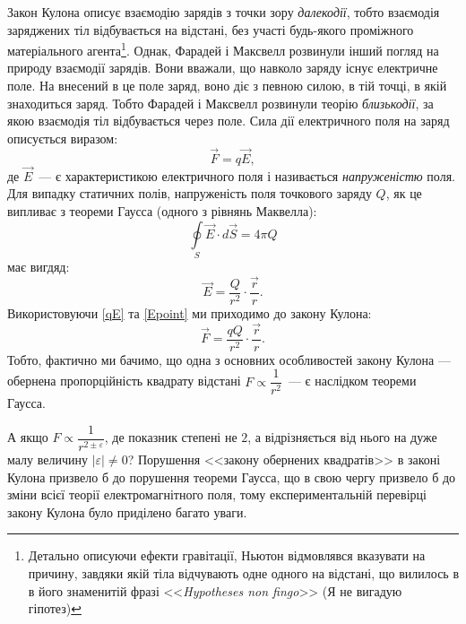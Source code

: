 \documentclass{LabWork}
\begin{document}
Закон Кулона описує взаємодію зарядів з точки зору \emph{далекодії}, тобто взаємодія заряджених тіл відбувається на відстані, без участі будь-якого проміжного матеріального агента\footnote{Детально описуючи ефекти гравітації, Ньютон відмовлявся вказувати на причину, завдяки якій тіла відчувають одне одного на відстані, що вилилось в в його знаменитій фразі <<\emph{Hypotheses non fingo}>> (Я не вигадую гіпотез)}. Однак, Фарадей і Максвелл розвинули інший погляд на природу взаємодії зарядів. Вони вважали, що навколо заряду існує електричне поле. На внесений в це поле заряд, воно діє з певною силою, в  тій точці, в якій знаходиться заряд. Тобто Фарадей і Максвелл розвинули теорію \emph{близькодії}, за якою взаємодія тіл відбувається через поле.  Сила дії електричного поля на заряд описується виразом:
\begin{equation}\label{qE}
    \vec{F} = q\vec{E},
\end{equation}
де $\vec{E}$~--- є характеристикою електричного поля і називається \emph{напруженістю} поля. Для випадку статичних полів, напруженість поля точкового заряду $Q$, як це випливає з теореми Гаусса (одного з рівнянь Маквелла):
\begin{equation}\label{Gauss}
    \oint\limits_S \vec{E}\cdot d\vec{S} = 4\pi Q
\end{equation}
 має вигдяд:
\begin{equation}\label{Epoint}
    \vec{E} = \frac{Q}{r^2}\cdot\frac{\vec{r}}{r}.
\end{equation}
Використовуючи \eqref{qE} та \eqref{Epoint} ми приходимо до закону Кулона:
\begin{equation*}\label{}
    \vec{F} = \frac{qQ}{r^2}\cdot\frac{\vec{r}}{r}.
\end{equation*}
Тобто, фактично ми бачимо, що одна з основних особливостей закону Кулона --- обернена пропорційність квадрату відстані $F \propto \dfrac1{r^2}$~--- є наслідком теореми Гаусса. 

А якщо $F \propto \dfrac1{r^{2 \pm \varepsilon}}$, де  показник степені не $2$, а відрізняється від нього на дуже малу величину $|\varepsilon| \neq 0$? Порушення <<закону обернених квадратів>> в законі Кулона призвело б до порушення теореми Гаусса, що в свою чергу призвело б до зміни всієї теорії електромагнітного поля, тому експериментальній перевірці закону Кулона було приділено багато уваги. 
\end{document}
